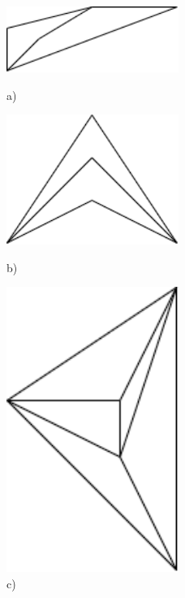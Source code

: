 \documentclass[a4paper]{article}
\begin{document}
	\begin{figure}[H]
		\begin{minipage}{0.3\textwidth}
			\centering
			\includegraphics[width=0.5\textwidth]{tut920_4.png}
			\caption*{a)}
		\end{minipage}
		\begin{minipage}{0.3\textwidth}
			\centering
			\includegraphics[width=0.5\textwidth]{tut920_5.png}
			\caption*{b)}
		\end{minipage}
		\begin{minipage}{0.3\textwidth}
			\centering
			\includegraphics[width=0.5\textwidth]{tut920_6.png}
			\caption*{c)}
		\end{minipage}
	\end{figure}
	
\end{document}
